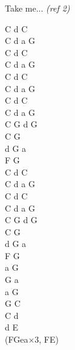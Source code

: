 \documentclass[a5paper, 10pt]{book}
\begin{document}
\begin{minipage}[t]{0.8\textwidth}
\hspace*{3mm}Take me... \textit{\small (ref 2)}\\

\end{minipage}
\begin{minipage}[t]{0.2\textwidth}
C d C\\
C d a G\\
C d C\\
C d a G\\

C d C\\
C d a G\\
C d C\\
C d a G\\

C G d G\\
C G\\
d G a\\
F G\\

C d C\\
C d a G\\
C d C\\
C d a G\\

C G d G\\
C G\\
d G a\\
F G\\

a G\\
G a\\
a G\\
G C\\
C d\\
d E\\
(FGea$\times$3, FE)\\
\end{minipage}

\newpage
\end{document}
